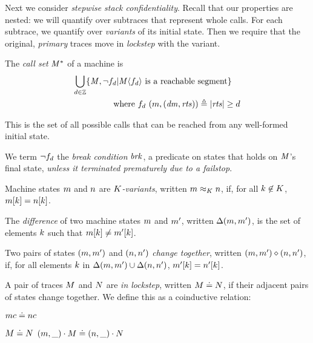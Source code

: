 \documentclass[10pt,conference]{ieeetran}%
\theoremstyle{definition}
\begin{document}
{Next we consider {\em stepwise stack confidentiality}. Recall that our properties are
nested: we will quantify over subtraces that represent whole calls. For each
subtrace, we quantify over {\em variants} of its initial state. Then we require
that the original, {\em primary} traces move in {\em lockstep} with the variant.

 The \emph{call set} \(\mathit{M}^*\) of a machine is
\[\begin{aligned}
\bigcup_{d \in \mathbb{Z}} \{\mathit{M}, \neg f_d | \mathit{M}\langle f_d \rangle
\text{ is a reachable segment}\} \hspace{1em} \\
\text{where } f_d ~ (m,(\mathit{dm},\mathit{rts})) \triangleq |\mathit{rts}| \geq d \\
\end{aligned}\]

\noindent
This is the set of all possible calls that can be reached from any well-formed initial state.

We term \(\neg f_d\) the {\em break condition} \(\mathit{brk}\), a predicate on
states that holds on \(\mathit{M}\)'s final state, {\em unless it terminated prematurely due to a failstop}.

 Machine states \(m\) and \(n\) are {\em \(K\)-variants},
written \(m \approx_K n\), if, for
all \(k \not \in K\), \(m[k] = n[k]\).

 The \emph{difference} of two machine states \(m\) and \(m'\), written \(\Delta(m,m')\),
is the set of elements \(k\)
such that \(m[k] \not = m'[k]\).

 Two pairs of states \((m,m')\) and \((n,n')\)
 {\em change together}, written \((m,m') \diamond (n,n')\), if, for all elements \(k\) in
\(\Delta(m,m') \cup \Delta(n,n')\),
\(m'[k] = n'[k]\).

 A pair of traces \(M\) and \(N\) are {\em in lockstep},
written \(M \doteq N\),
if their adjacent pairs of states change together.  We define this as a coinductive relation:

\smallskip
\begin{minipage}[b]{.2\columnwidth}
\judgment{}
         {\(mc \doteq nc\)}
\end{minipage}
\begin{minipage}[b]{.75\columnwidth}
\judgmenttwo{\(\mach, \pi_\mach(\head(\machT)) \diamond \nach, \pi_\mach(\head(\nachT))\)}
            {\(M \doteq N\)}
            {\((m,\relax{\_}) \cdot M \doteq (n,\relax{\_}) \cdot N\)}
\end{minipage}

}
\end{document}
